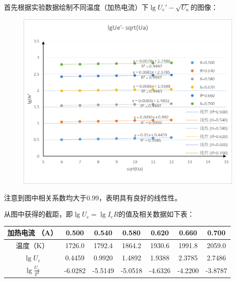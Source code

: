 \documentclass[UTF8]{ctexart}
\begin{document}
首先根据实验数据绘制不同温度（加热电流）下$\lg U_{e}'-\sqrt{U_{a}} $的图像：
\begin{figure}[H]
  \centering
  \includegraphics[scale=0.9]{图1.png}
\end{figure}

注意到图中相关系数均大于0.99，表明具有良好的线性性。


从图中获得的截距，即$\lg U_{e}= \lg I_{e}R$的值及相关数据如下表：

\begin{center}
  \begin{tabular}{c|c|c|c|c|c|c}
    \hline 加热电流 （A） & 0.500&0.540&0.580&0.620&0.660&0.700 \\
    \hline 温度（K）  & 1726.0&1792.4&1864.2&1930.6&1991.8&2059.0 \\
    \hline $\lg U_{e}$  & 0.4459&0.9920&1.4892&1.9388&2.3785&2.7486 \\
    \hline $\lg \frac{U_{e}}{T^2}$  &-6.0282&-5.5149&-5.0518&-4.6326&-4.2200&-3.8787 \\
    \hline
  \end{tabular}
\end{center}
\end{document}
